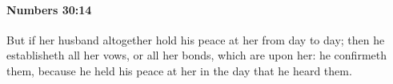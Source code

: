 
		\paragraph{Numbers 30:14} %
			\label{NUMBERS-30-14}

			But if her husband altogether hold his peace at her from day to day; then he establisheth all her vows, or all her bonds, which are upon her: he confirmeth them, because he held his peace at her in the day that he heard them.


